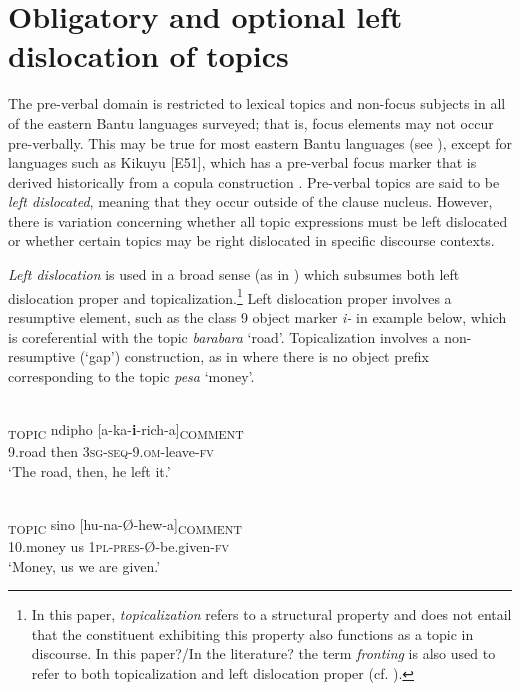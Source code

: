 \documentclass[output=paper]{langsci/langscibook}
\begin{document}
\section{Obligatory and optional left dislocation of topics}\label{§3:obligatory.nicolle}

The pre-verbal domain is restricted to lexical topics and non-focus subjects in all of the eastern Bantu languages surveyed; that is, focus elements may not occur pre-verbally. This may be true for most eastern Bantu languages (see \citealt{zerbian2006,vanderwal2009,yoneda2011}), except for languages such as Kikuyu [E51], which has a pre-verbal focus marker that is derived historically from a copula construction \citep{schwarz2003kikuyu,schwarz2007kikuyu,vanderwal2014}. Pre-verbal topics are said to be \textit{left dislocated}, meaning that they occur outside of the clause nucleus. However, there is variation concerning whether all topic expressions must be left dislocated or whether certain topics may be right dislocated in specific discourse contexts.

\textit{Left dislocation} is used in a broad sense (as in \citealt{shaeretal2009}) which subsumes both left dislocation proper and topicalization.\footnote{In this paper, \textit{topicalizat}\textit{ion} refers to a structural property and does not entail that the constituent exhibiting this property also functions as a topic in discourse. In this paper?/In the literature? the term \textit{fronting} is also used to refer to both topicalization and left dislocation proper (cf. \citealt[313]{cohen2009}).} Left dislocation proper involves a resumptive element, such as the class 9 object marker \textit{i}\textit{-} in example  below, which is coreferential with the topic \textit{barabara} ‘road’. Topicalization involves a non-resumptive (‘gap’) construction, as in  where there is no object prefix corresponding to the topic \textit{pesa} ‘money’.

\ea\label{ex:2.nicolle}
\\
\gll [Barabara]\textsubscript{TOPIC} ndipho [a-ka-\textbf{i}-rich-a]\textsubscript{COMMENT}\\
     {\db}9.road then {\db}\textsc{3sg-seq}-9.\textsc{om}-leave-\textsc{fv}\\
\glt ‘The road, then, he left it.’
\z

\ea\label{ex:3.nicolle}
\\
\gll [Pesa]\textsubscript{TOPIC} sino [hu-na-Ø-hew-a]\textsubscript{COMMENT}\\
{\db}10.money us {\db}\textsc{1pl-pres}-Ø-be.given-\textsc{fv}\\
\glt ‘Money, us we are given.’
\z
\end{document}

